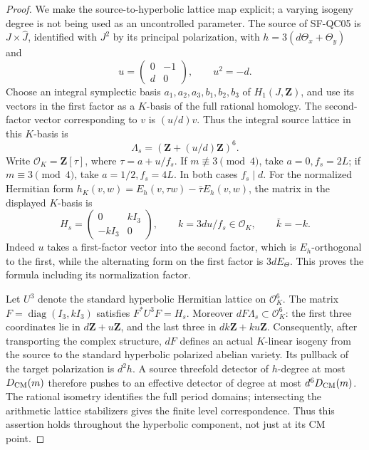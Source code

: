 \begin{proof}
We make the source-to-hyperbolic lattice map explicit; a varying
isogeny degree is not being used as an uncontrolled parameter.
The source of SF-QC05 is $J\times\widehat J$, identified with
$J^2$ by its principal polarization, with
$h=3(d\Theta_x+\Theta_y)$ and
\[
 u=\begin{pmatrix}0&-1\\d&0\end{pmatrix},\qquad u^2=-d.
\]
Choose an integral symplectic basis $a_1,a_2,a_3,b_1,b_2,b_3$
of $H_1(J,\mathbf Z)$, and use its vectors in the first factor
as a $K$-basis of the full rational homology. The second-factor
vector corresponding to $v$ is $(u/d)v$. Thus the integral source
lattice in this $K$-basis is
\[
 \Lambda_s=(\mathbf Z+(u/d)\mathbf Z)^6.
\]
Write $\mathcal O_K=\mathbf Z[\tau]$, where
$\tau=a+u/f_s$. If $m\not\equiv3\pmod4$, take
$a=0,f_s=2L$; if $m\equiv3\pmod4$, take
$a=1/2,f_s=4L$. In both cases $f_s\mid d$.
For the normalized Hermitian form
$h_K(v,w)=E_h(v,\tau w)-\bar\tau E_h(v,w)$,
the matrix in the displayed $K$-basis is
\[
 H_s=\begin{pmatrix}0&kI_3\\-kI_3&0\end{pmatrix},
 \qquad k=3du/f_s\in\mathcal O_K,
 \qquad\bar k=-k.
\]
Indeed $u$ takes a first-factor vector into the second factor,
which is $E_h$-orthogonal to the first, while the alternating form
on the first factor is $3dE_\Theta$. This proves the formula
including its normalization factor.

Let $U^3$ denote the standard hyperbolic Hermitian lattice on
$\mathcal O_K^6$. The matrix
$F=\operatorname{diag}(I_3,kI_3)$ satisfies
$F^*U^3F=H_s$. Moreover $dF\Lambda_s\subset\mathcal O_K^6$:
the first three coordinates lie in $d\mathbf Z+u\mathbf Z$,
and the last three in $dk\mathbf Z+ku\mathbf Z$.
Consequently, after transporting the complex structure, $dF$
defines an actual $K$-linear isogeny from the source to the
standard hyperbolic polarized abelian variety. Its pullback of
the target polarization is $d^2h$. A source threefold detector
of $h$-degree at most $D_{\rm CM}(m)$ therefore pushes to an
effective detector of degree at most $d^6D_{\rm CM}(m)$.
The rational isometry identifies the full period domains;
intersecting the arithmetic lattice stabilizers gives the finite
level correspondence. Thus this assertion holds throughout the
hyperbolic component, not just at its CM point.


\end{proof}
